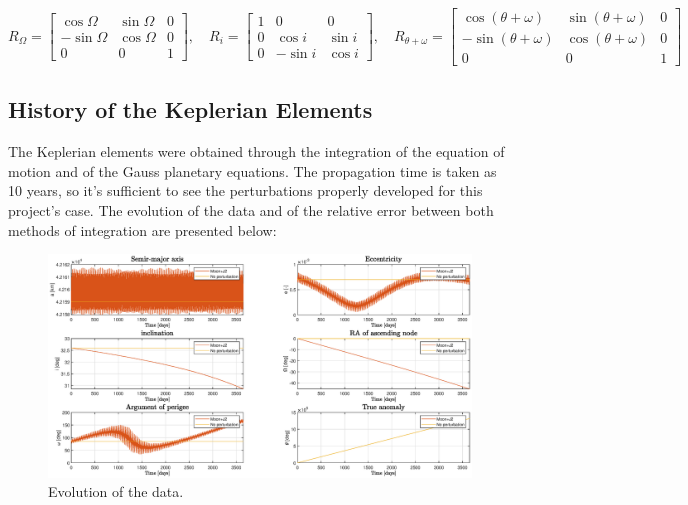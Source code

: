 \documentclass{article}
\begin{document}
\[
R_{\Omega} = \begin{bmatrix}
	\cos \Omega & \sin \Omega & 0 \\
	-\sin \Omega & \cos \Omega & 0 \\
	0 & 0 & 1
\end{bmatrix}, \quad
R_{i} = \begin{bmatrix}
	1 & 0 & 0 \\
	0 & \cos i & \sin i \\
	0 & -\sin i & \cos i
\end{bmatrix}, \quad
R_{\theta + \omega} = \begin{bmatrix}
	\cos (\theta + \omega) & \sin (\theta + \omega) & 0 \\
	-\sin (\theta + \omega) & \cos (\theta + \omega) & 0 \\
	0 & 0 & 1
\end{bmatrix}
\]

\subsection{History of the Keplerian Elements} 

The Keplerian elements were obtained through the integration of the equation of motion and of the Gauss planetary equations. The propagation time is taken as 10 years, so it's sufficient to see the perturbations properly developed for this project's case. The evolution of the data and of the relative error between both methods of integration are presented below:

\begin{figure}[H]
	\centering
	\includegraphics[width=1\textwidth]{orbitprop10yrs.eps}
	\caption{Evolution of the data.}
	\label{fig:orbitprop10yrs}
\end{figure}
\end{document}
